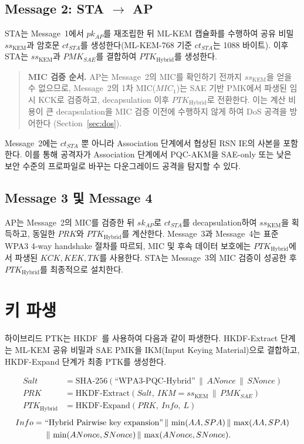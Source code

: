 \documentclass[11pt]{article}
\newcommand{\pkAP}{\ensuremath{pk_{AP}}}
\newcommand{\skAP}{\ensuremath{sk_{AP}}}
\newcommand{\ctSTA}{\ensuremath{ct_{STA}}}
\newcommand{\ssK}{\ensuremath{ss_{\mathrm{KEM}}}}
\newcommand{\pmkSAE}{\ensuremath{PMK_{SAE}}}
\newcommand{\ptkH}{\ensuremath{PTK_{\mathrm{Hybrid}}}}
\newcommand{\ANonce}{\ensuremath{ANonce}}
\newcommand{\SNonce}{\ensuremath{SNonce}}
\newcommand{\cat}{\,\|\,}
\theoremstyle{definition}
\theoremstyle{plain}
\begin{document}
\subsection{Message 2: STA $\to$ AP}
STA는 Message~1에서 \pkAP{}를 재조립한 뒤 ML-KEM 캡슐화를 수행하여 공유
비밀 \ssK{}과 암호문 \ctSTA{}를 생성한다(ML-KEM-768 기준 \ctSTA{}는 1088
바이트). 이후 STA는 \ssK{}과 \pmkSAE{}를 결합하여 \ptkH{}를 생성한다.

\begin{quote}\small
\textbf{MIC 검증 순서.} AP는 Message~2의 MIC를 확인하기 전까지 \ssK{}을 얻을
수 없으므로, Message~2의 1차 MIC($MIC_1$)는 SAE 기반 PMK에서 파생된 임시
KCK로 검증하고, decapsulation 이후 \ptkH{}로 전환한다. 이는 계산 비용이 큰
decapsulation을 MIC 검증 이전에 수행하지 않게 하여 DoS 공격을 방어한다
(Section~\ref{sec:dos}).
\end{quote}

Message~2에는 \ctSTA{} 뿐 아니라 Association 단계에서 협상된 RSN IE의 사본을
포함한다. 이를 통해 공격자가 Association 단계에서 PQC-AKM을 SAE-only 또는 낮은
보안 수준의 프로파일로 바꾸는 다운그레이드 공격을 탐지할 수 있다.

\subsection{Message 3 및 Message 4}
AP는 Message~2의 MIC를 검증한 뒤 \skAP{}로 \ctSTA{}를 decapsulation하여
\ssK{}을 획득하고, 동일한 $PRK$와 \ptkH{}를 계산한다. Message~3과
Message~4는 표준 WPA3 4-way handshake 절차를 따르되, MIC 및 후속 데이터
보호에는 \ptkH{}에서 파생된 $KCK,KEK,TK$를 사용한다. STA는 Message~3의 MIC
검증이 성공한 후 \ptkH{}를 최종적으로 설치한다.

\section{키 파생}\label{sec:kdf}
하이브리드 PTK는 HKDF~\cite{rfc5869}를 사용하여 다음과 같이 파생한다. HKDF-Extract
단계는 ML-KEM 공유 비밀과 SAE PMK을 IKM(Input Keying Material)으로 결합하고,
HKDF-Expand 단계가 최종 PTK를 생성한다.

\begin{align}
Salt &= \text{SHA-256}(\text{``WPA3-PQC-Hybrid''} \cat \ANonce \cat \SNonce) \label{eq:salt}\\
PRK  &= \text{HKDF-Extract}(Salt,\ IKM = \ssK \cat \pmkSAE) \label{eq:prk}\\
\ptkH &= \text{HKDF-Expand}(PRK,\ Info,\ L) \label{eq:ptk}
\end{align}
\begin{align}
Info =\ &\text{``Hybrid Pairwise key expansion''} \cat \min(AA,SPA) \cat \max(AA,SPA) \notag\\
        &\cat \min(\ANonce,\SNonce) \cat \max(\ANonce,\SNonce). \label{eq:info}
\end{align}
\end{document}
